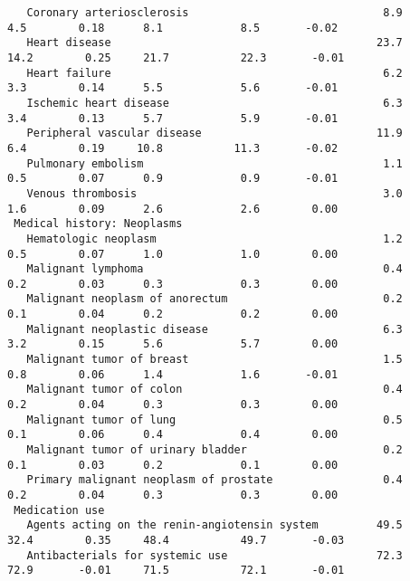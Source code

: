 \documentclass[]{article}
\begin{document}
\begin{verbatim}
   Coronary arteriosclerosis                              8.9             4.5        0.18      8.1            8.5       -0.02    
   Heart disease                                         23.7            14.2        0.25     21.7           22.3       -0.01    
   Heart failure                                          6.2             3.3        0.14      5.5            5.6       -0.01    
   Ischemic heart disease                                 6.3             3.4        0.13      5.7            5.9       -0.01    
   Peripheral vascular disease                           11.9             6.4        0.19     10.8           11.3       -0.02    
   Pulmonary embolism                                     1.1             0.5        0.07      0.9            0.9       -0.01    
   Venous thrombosis                                      3.0             1.6        0.09      2.6            2.6        0.00    
 Medical history: Neoplasms                                                                                                      
   Hematologic neoplasm                                   1.2             0.5        0.07      1.0            1.0        0.00    
   Malignant lymphoma                                     0.4             0.2        0.03      0.3            0.3        0.00    
   Malignant neoplasm of anorectum                        0.2             0.1        0.04      0.2            0.2        0.00    
   Malignant neoplastic disease                           6.3             3.2        0.15      5.6            5.7        0.00    
   Malignant tumor of breast                              1.5             0.8        0.06      1.4            1.6       -0.01    
   Malignant tumor of colon                               0.4             0.2        0.04      0.3            0.3        0.00    
   Malignant tumor of lung                                0.5             0.1        0.06      0.4            0.4        0.00    
   Malignant tumor of urinary bladder                     0.2             0.1        0.03      0.2            0.1        0.00    
   Primary malignant neoplasm of prostate                 0.4             0.2        0.04      0.3            0.3        0.00    
 Medication use                                                                                                                  
   Agents acting on the renin-angiotensin system         49.5            32.4        0.35     48.4           49.7       -0.03    
   Antibacterials for systemic use                       72.3            72.9       -0.01     71.5           72.1       -0.01    

\end{verbatim}
\end{document}
